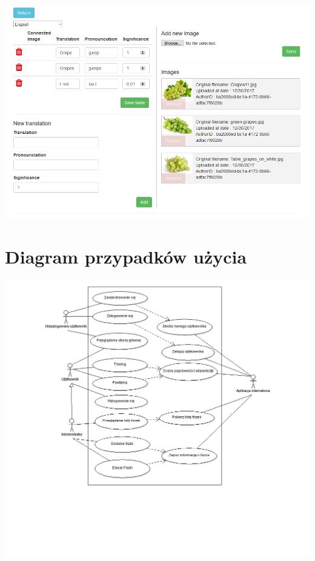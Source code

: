 \begin{center}
	\centering
	\includegraphics[width=\textwidth]{images/Management.png}
\end{center}


\section{Diagram przypadków użycia}

\begin{center}
	\includegraphics[height=\textwidth]{images/usecases.png}
\end{center}


